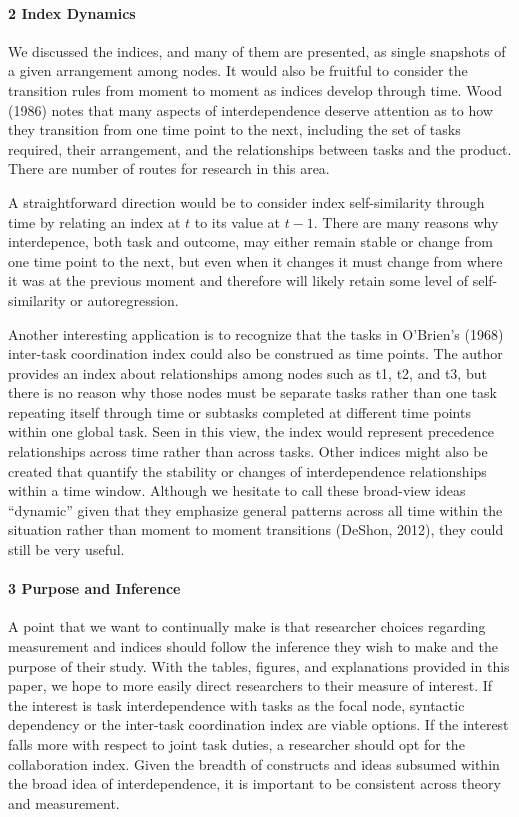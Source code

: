 \documentclass[english,,man]{apa6}
\let\oldparagraph\paragraph
\renewcommand{\paragraph}[1]{\oldparagraph{#1}\mbox{}}
\theoremstyle{definition}
\theoremstyle{definition}
\theoremstyle{definition}
\theoremstyle{remark}
\begin{document}
\hypertarget{index-dynamics}{%
\paragraph{2 Index Dynamics}\label{index-dynamics}}

We discussed the indices, and many of them are presented, as single
snapshots of a given arrangement among nodes. It would also be fruitful
to consider the transition rules from moment to moment as indices
develop through time. Wood (1986) notes that many aspects of
interdependence deserve attention as to how they transition from one
time point to the next, including the set of tasks required, their
arrangement, and the relationships between tasks and the product. There
are number of routes for research in this area.

A straightforward direction would be to consider index self-similarity
through time by relating an index at \(t\) to its value at \(t-1\).
There are many reasons why interdepence, both task and outcome, may
either remain stable or change from one time point to the next, but even
when it changes it must change from where it was at the previous moment
and therefore will likely retain some level of self-similarity or
autoregression.

Another interesting application is to recognize that the tasks in
O'Brien's (1968) inter-task coordination index could also be construed
as time points. The author provides an index about relationships among
nodes such as t1, t2, and t3, but there is no reason why those nodes
must be separate tasks rather than one task repeating itself through
time or subtasks completed at different time points within one global
task. Seen in this view, the index would represent precedence
relationships across time rather than across tasks. Other indices might
also be created that quantify the stability or changes of
interdependence relationships within a time window. Although we hesitate
to call these broad-view ideas \enquote{dynamic} given that they
emphasize general patterns across all time within the situation rather
than moment to moment transitions (DeShon, 2012), they could still be
very useful.

\hypertarget{purpose-and-inference-1}{%
\paragraph{3 Purpose and Inference}\label{purpose-and-inference-1}}

A point that we want to continually make is that researcher choices
regarding measurement and indices should follow the inference they wish
to make and the purpose of their study. With the tables, figures, and
explanations provided in this paper, we hope to more easily direct
researchers to their measure of interest. If the interest is task
interdependence with tasks as the focal node, syntactic dependency or
the inter-task coordination index are viable options. If the interest
falls more with respect to joint task duties, a researcher should opt
for the collaboration index. Given the breadth of constructs and ideas
subsumed within the broad idea of interdependence, it is important to be
consistent across theory and measurement.
\end{document}
